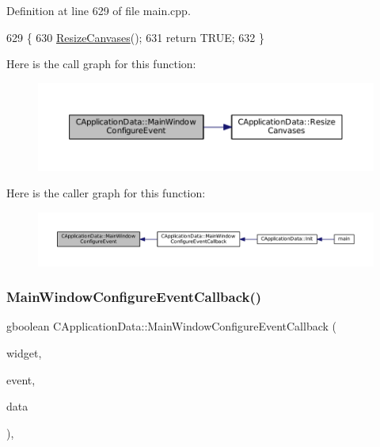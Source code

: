 Definition at line 629 of file main.\+cpp.


\begin{DoxyCode}
629                                                                                      \{
630     \hyperlink{classCApplicationData_ad8b16ccb099b4996ce9fee34a407c091}{ResizeCanvases}();
631     \textcolor{keywordflow}{return} TRUE;
632 \}
\end{DoxyCode}
Here is the call graph for this function\+:
\nopagebreak
\begin{figure}[H]
\begin{center}
\leavevmode
\includegraphics[width=350pt]{classCApplicationData_a7abef8a548d0ad3adb70f11d8a74176c_cgraph}
\end{center}
\end{figure}
Here is the caller graph for this function\+:
\nopagebreak
\begin{figure}[H]
\begin{center}
\leavevmode
\includegraphics[width=350pt]{classCApplicationData_a7abef8a548d0ad3adb70f11d8a74176c_icgraph}
\end{center}
\end{figure}
\hypertarget{classCApplicationData_a31b48405b43d73cabca4c080c1b9beee}{}\label{classCApplicationData_a31b48405b43d73cabca4c080c1b9beee} 
\subsubsection{\texorpdfstring{Main\+Window\+Configure\+Event\+Callback()}{MainWindowConfigureEventCallback()}}
{\footnotesize\ttfamily gboolean C\+Application\+Data\+::\+Main\+Window\+Configure\+Event\+Callback (\begin{DoxyParamCaption}\item[{Gtk\+Widget $\ast$}]{widget,  }\item[{Gdk\+Event $\ast$}]{event,  }\item[{gpointer}]{data }\end{DoxyParamCaption})\hspace{0.3cm}{\ttfamily [static]}, {\ttfamily [protected]}}



